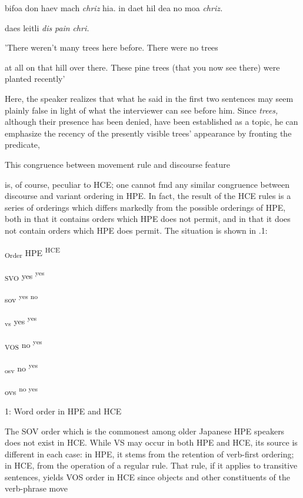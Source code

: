 \ea\label{ex:26}
bifoa don haev mach \textit{chriz} hia. in daet hil dea no moa \textit{chriz.}
\glt
\z

daes leitli \textit{dis} \textit{pain} \textit{chri.}

'There weren't many trees here before. There were no trees







at all on that hill over there. These pine trees (that you now see there) were planted recently'

Here, the speaker realizes that what he said in the first two sentences may seem plainly false in light of what the interviewer can see before him. Since \textit{trees,} although their presence has been denied, have been established as a topic, he can emphasize the recency of the presently visible trees' appearance by fronting the predicate,

This congruence between movement rule and discourse feature

is, of course, peculiar to HCE; one cannot fmd any similar congruence between discourse and variant ordering in HPE. In fact, the result of the HCE rules is a series of orderings which differs markedly from the possible orderings of HPE, both in that it contains orders which HPE does not permit, and in that it does not contain orders which HPE does permit. The situation is shown in .1:

\textsubscript{Order }HPE \textsuperscript{HCE}

\textsubscript{SVO }yes \textsuperscript{yes}

sov \textsuperscript{yes no}

\textsubscript{vs }yes \textsuperscript{yes}

\textsubscript{VOS }no \textsuperscript{yes}

\textsubscript{osv }no \textsuperscript{yes}

ovs \textsuperscript{no yes}

\begin{table}
	\caption{1: Word order in HPE and HCE}
	\label{tab:1}
\end{table}

The SOV order which is the commonest among older Japanese HPE speakers does not exist in HCE. While VS may occur in both HPE and HCE, its source is different in each case: in HPE, it stems from the retention of verb-first ordering; in HCE, from the operation of a regular rule. That rule, if it applies to transitive sentences, yields VOS order in HCE since objects and other constituents of the verb-phrase move

